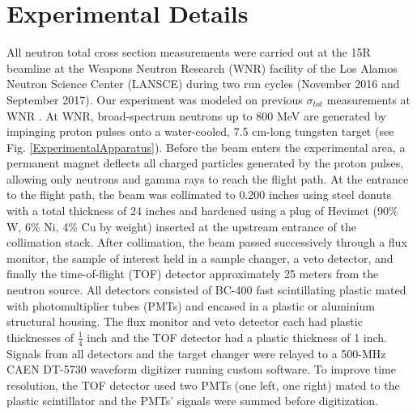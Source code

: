 \documentclass[twocolumn,secnumarabic,amssymb, nobibnotes, aps, prl,
superscriptaddress, nobalancelastpage]{revtex4}
\newcommand{\tots}{\ensuremath{\sigma_{tot}}\,\,}
\begin{document}
\section{Experimental Details}
All neutron total cross section measurements were carried out at the 15R
beamline at the Weapons Neutron Research (WNR) facility of the Los Alamos
Neutron Science Center (LANSCE) during two run cycles (November 2016 and
September 2017). Our experiment was modeled on previous
\tots measurements at WNR \cite{Finlay1993,Abfalterer2001,Shane2010}. At WNR,
broad-spectrum neutrons up
to 800 MeV are generated by impinging proton pulses onto a water-cooled, 7.5
cm-long tungsten target (see Fig. \ref{ExperimentalApparatus}). Before the beam
enters the experimental area, a
permanent magnet deflects all charged particles generated by the proton pulses, 
allowing only neutrons and gamma rays to reach the flight path. At the
entrance to the flight path, the beam was collimated to 0.200 inches using steel
donuts with a total thickness of 24 inches and hardened using a plug of Hevimet (90\% W, 6\% 
Ni, 4\% Cu by weight) inserted at the upstream entrance of the
collimation stack. After collimation, the beam passed successively through a flux 
monitor, the sample of interest held in a sample changer, a veto detector, and finally the 
time-of-flight (TOF) detector approximately 25 meters from the neutron source.
All detectors consisted of BC-400 fast scintillating plastic mated with 
photomultiplier tubes (PMTs) and encased in a plastic or
aluminium structural housing. The flux monitor and veto detector each had
plastic thicknesses of $\frac{1}{4}$ inch and the TOF detector had a plastic
thickness of 1 inch. Signals from all detectors and
the target changer were relayed to a 500-MHz CAEN DT-5730 waveform digitizer
running custom software. To improve time resolution, the TOF detector used two
PMTs (one left, one right) mated to the plastic scintillator and the PMTs' signals were 
summed before digitization.
\end{document}
